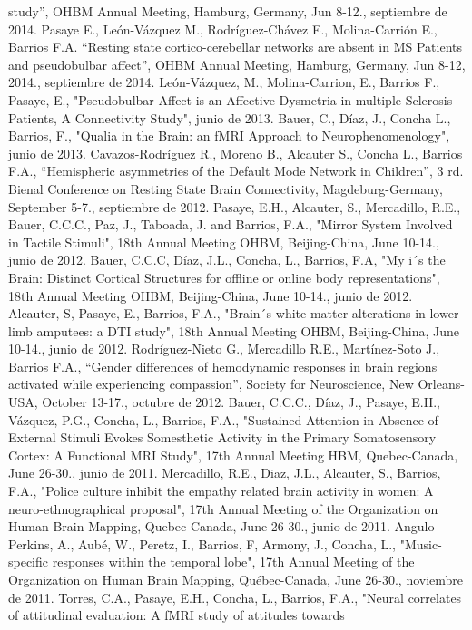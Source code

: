 \documentclass[11pt]{article}
\begin{document}
\begin{enumerate}
study”, OHBM Annual Meeting, Hamburg, Germany, Jun 8-12.,  septiembre de 2014.
Pasaye E., León-Vázquez M., Rodríguez-Chávez E., Molina-Carrión E., Barrios F.A. “Resting state cortico-cerebellar networks are absent in MS 
Patients and pseudobulbar affect”, OHBM Annual Meeting, Hamburg, Germany, Jun 8-12, 2014.,  septiembre de 2014.
León-Vázquez, M., Molina-Carrion, E., Barrios F., Pasaye, E., "Pseudobulbar Affect is an Affective Dysmetria in multiple Sclerosis Patients, A 
Connectivity Study",  junio de 2013.
Bauer, C., Díaz, J., Concha L., Barrios, F., "Qualia in the Brain: an fMRI Approach to Neurophenomenology",  junio de 2013.
Cavazos-Rodríguez R., Moreno B., Alcauter S., Concha L., Barrios F.A., “Hemispheric asymmetries of the Default Mode Network in Children”, 3 
rd. Bienal Conference on Resting State Brain Connectivity, Magdeburg-Germany, September 5-7.,  septiembre de 2012.
Pasaye, E.H., Alcauter, S., Mercadillo, R.E., Bauer, C.C.C., Paz, J., Taboada, J. and Barrios, F.A., "Mirror System Involved in Tactile 
Stimuli", 18th Annual Meeting OHBM, Beijing-China, June 10-14.,  junio de 2012.
Bauer, C.C.C, Díaz, J.L., Concha, L., Barrios, F.A, "My i´s the Brain: Distinct Cortical Structures for offline or online body 
representations", 18th Annual Meeting OHBM, Beijing-China, June 10-14.,  junio de 2012.
Alcauter, S, Pasaye, E., Barrios, F.A., "Brain´s white matter alterations in lower limb amputees: a DTI study", 18th Annual Meeting OHBM, 
Beijing-China, June 10-14.,  junio de 2012.
Rodríguez-Nieto G., Mercadillo R.E., Martínez-Soto J., Barrios F.A., “Gender differences of hemodynamic responses in brain regions activated 
while experiencing compassion”, Society for Neuroscience, New Orleans-USA, October 13-17.,  octubre de 2012.
Bauer, C.C.C., Díaz, J., Pasaye, E.H., Vázquez, P.G., Concha, L., Barrios, F.A., "Sustained Attention in Absence of External Stimuli Evokes 
Somesthetic Activity in the Primary Somatosensory Cortex: A Functional MRI Study", 17th Annual Meeting HBM, Quebec-Canada, June 26-30.,  junio 
de 2011.
Mercadillo, R.E., Diaz, J.L., Alcauter, S., Barrios, F.A., "Police culture inhibit the empathy related brain activity in women: A 
neuro-ethnographical proposal", 17th Annual Meeting of the Organization on Human Brain Mapping, Quebec-Canada, June 26-30.,  junio de 2011.
Angulo-Perkins, A., Aubé, W., Peretz, I., Barrios, F, Armony, J., Concha, L., "Music-specific responses within the temporal lobe", 17th Annual 
Meeting of the Organization on Human Brain Mapping, Québec-Canada, June 26-30.,  noviembre de 2011.
Torres, C.A., Pasaye, E.H., Concha, L., Barrios, F.A., "Neural correlates of attitudinal evaluation: A fMRI study of attitudes towards 

\end{enumerate}
\end{document}
